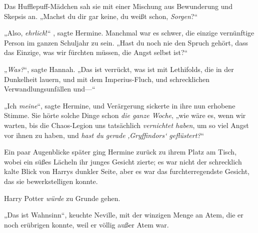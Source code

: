 Das Hufflepuff-Mädchen sah sie mit einer Mischung aus Bewunderung und Skepsis an. „Machst du dir gar keine, du weißt schon, \emph{Sorgen}?“

„Also, \emph{ehrlich}!“ , sagte Hermine. Manchmal war es schwer, die einzige vernünftige Person im ganzen Schuljahr zu sein. „Hast du noch nie den Spruch gehört, dass das Einzige, was wir fürchten müssen, die Angst selbst ist?“

„\emph{Was?}“, sagte Hannah. „Das ist verrückt, was ist mit Lethifolds, die in der Dunkelheit lauern, und mit dem Imperius-Fluch, und schrecklichen Verwandlungsunfällen und—“

„Ich \emph{meine}“, sagte Hermine, und Verärgerung sickerte in ihre nun erhobene Stimme. Sie hörte solche Dinge schon \emph{die ganze Woche}, „wie wäre es, wenn wir warten, bis die Chaos-Legion uns tatsächlich \emph{vernichtet haben}, um so viel Angst vor ihnen zu haben, und \emph{hast du gerade} \emph{‚Gryffindors‘ geflüstert?}“

Ein paar Augenblicke später ging Hermine zurück zu ihrem Platz am Tisch, wobei ein süßes Lächeln ihr junges Gesicht zierte; es war nicht der schrecklich kalte Blick von Harrys dunkler Seite, aber es war das furchterregendste Gesicht, das sie bewerkstelligen konnte.

Harry Potter \emph{würde} zu Grunde gehen.

\later

„Das ist Wahnsinn“, keuchte Neville, mit der winzigen Menge an Atem, die er noch erübrigen konnte, weil er völlig außer Atem war.

